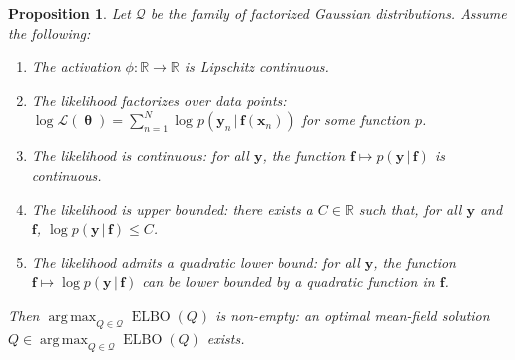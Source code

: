 \documentclass[twoside]{article}
\newcommand{\vf}{\mathbf{f}}
\newcommand{\vx}{\mathbf{x}}
\newcommand{\vy}{\mathbf{y}}
\newcommand{\vtheta}{\bm{\uptheta}}
\newcommand{\R}{\mathbb{R}}
\newcommand{\opspace}{}
\DeclareMathOperator*{\argmax}{arg\,max\opspace}
\newcommand{\cond}{\,|\,}                  %
\theoremstyle{theoremstyle}
\newtheorem{proposition}[theorem]{Proposition}
\begin{document}
\begin{proposition} \label{prop:existence-mf-solution}
    Let $\mathcal{Q}$ be the family of factorized Gaussian distributions.
    Assume the following:
    \begin{enumerate}[label=(\roman*)]%
        \item The activation $\phi\colon\R \to\R$ is Lipschitz continuous.
        \item The likelihood factorizes over data points: $\log \mathcal{L}(\vtheta) = \sum_{n=1}^N \log p(\vy_n \cond \vf(\vx_n))$ for some function $p$.
        \item The likelihood is continuous: for all $\vy$, the function $\vf \mapsto p(\vy \cond \vf)$ is continuous.
        \item The likelihood is upper bounded: there exists a $C \in \R$ such that, for all $\vy$ and $\vf$, $\log p(\vy \cond \vf) \leq C$.
        \item The likelihood admits a quadratic lower bound:
        for all $\vy$, the function $\vf \mapsto \log p(\vy \cond \vf)$ can be lower bounded by a quadratic function in $\vf$.
    \end{enumerate}
    Then $\argmax_{Q \in \mathcal{Q}} \operatorname{ELBO}(Q)$ is non-empty:
    an optimal mean-field solution $Q \in \argmax_{Q \in \mathcal{Q}} \operatorname{ELBO}(Q)$ exists.
\end{proposition}
\end{document}
